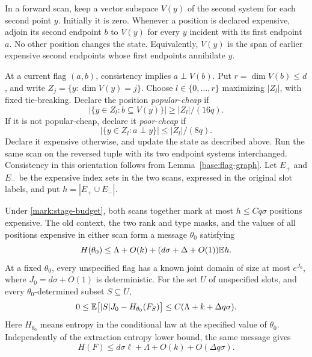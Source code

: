 In a forward scan, keep a vector subspace $V(y)$ of the second system for
each second point $y$. Initially it is zero. Whenever a position is
declared expensive, adjoin its second endpoint $b$ to $V(y)$ for every
$y$ incident with its first endpoint $a$. No other position changes the
state. Equivalently, $V(y)$ is the span of earlier expensive second
endpoints whose first endpoints annihilate $y$.

At a current flag $(a,b)$, consistency implies $a\perp V(b)$. Put
$r=\dim V(b)\le d$, and write $Z_j=\{y:\dim V(y)=j\}$. Choose
$l\in\{0,\ldots,r\}$ maximizing $|Z_l|$, with fixed tie-breaking.
Declare the position \emph{popular-cheap} if
\begin{equation}\label{mark:popular}
 |\{y\in Z_l:b\subseteq V(y)\}|\ge |Z_l|/(16q).
\end{equation}
If it is not popular-cheap, declare it \emph{poor-cheap} if
\begin{equation}\label{mark:poor}
 |\{y\in Z_l:a\perp y\}|\le |Z_l|/(8q).
\end{equation}
Declare it expensive otherwise, and update the state as described above.
Run the same scan on the reversed tuple with its two endpoint systems
interchanged. Consistency in this orientation follows from
Lemma~\ref{base:flag-graph}.
Let $E_+$ and $E_-$ be the expensive index sets in the two scans,
expressed in the original slot labels, and put $h=|E_+\cup E_-|$.

\begin{lemma}\label{mark:marking}
Under \eqref{mark:stage-budget}, both scans together mark at most
$h\le Cq\sigma$ positions expensive. The old context, the two rank and
type masks, and the values of all positions expensive in either scan
form a message $\theta_0$ satisfying
\begin{equation}\label{mark:message-cost}
 H(\theta_0)\le\Lambda+O(k)
       +(d\sigma+\Delta+O(1))\mathbb E h.
\end{equation}
At a fixed $\theta_0$, every unspecified flag has a known joint domain
of size at most $e^{J_0}$, where $J_0=d\sigma+O(1)$ is deterministic.
For the set $U$ of unspecified slots, and every $\theta_0$-determined
subset $S\subseteq U$,
\begin{equation}\label{mark:subset-deficit}
 0\le \mathbb E\bigl[|S|J_0-H_{\theta_0}(F_S)\bigr]
       \le C(\Lambda+k+\Delta q\sigma).
\end{equation}
Here $H_{\theta_0}$ means entropy in the conditional law at the specified
value of $\theta_0$. Independently of the extraction entropy lower bound,
the same message gives
\begin{equation}\label{mark:entropy-upper}
 H(F)\le d\sigma\ell+\Lambda+O(k)+O(\Delta q\sigma).
\end{equation}
\end{lemma}

